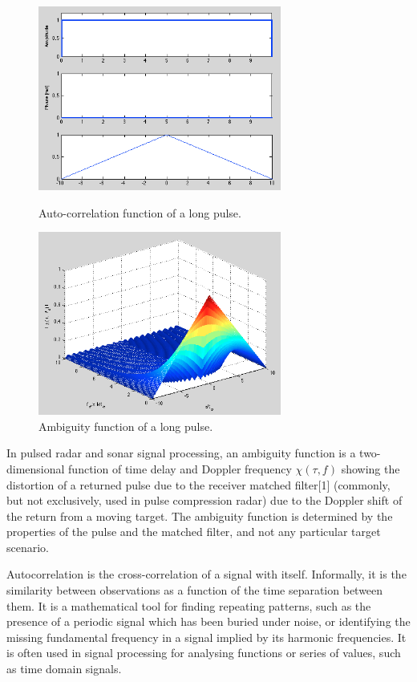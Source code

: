 \documentclass{article}
\begin{document}
\begin{figure}[bth]
\begin{minipage}[t]{0.5\linewidth}
\centering
\includegraphics[width=8cm]{Figures/long_pulse_data.png}
\caption{Auto-correlation function of a long pulse.}
\label{fig:long_pulse_data}
\end{minipage}
\begin{minipage}[t]{0.5\linewidth}
\centering
\includegraphics[width=8cm]{Figures/long_pulse_3d.png}
\caption{Ambiguity function of a long pulse.}
\label{fig:long_pulse_3d}
\end{minipage}
\end{figure}

In pulsed radar and sonar signal processing, an ambiguity function is a two-dimensional function of time delay and Doppler frequency $\chi(\tau,f)$ showing the distortion of a returned pulse due to the receiver matched filter[1] (commonly, but not exclusively, used in pulse compression radar) due to the Doppler shift of the return from a moving target. The ambiguity function is determined by the properties of the pulse and the matched filter, and not any particular target scenario.

Autocorrelation is the cross-correlation of a signal with itself. Informally, it is the similarity between observations as a function of the time separation between them. It is a mathematical tool for finding repeating patterns, such as the presence of a periodic signal which has been buried under noise, or identifying the missing fundamental frequency in a signal implied by its harmonic frequencies. It is often used in signal processing for analysing functions or series of values, such as time domain signals.
\end{document}
